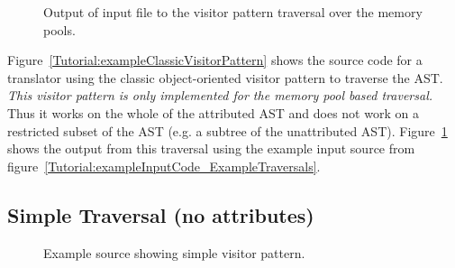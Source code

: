 \begin{figure}[!h]
{\indent
{\mySmallFontSize


\begin{latexonly}
   
\end{latexonly}

\begin{htmlonly}
   
\end{htmlonly}

}
}
\caption{Output of input file to the visitor pattern traversal over the memory pools.}
\label{Tutorial:exampleOutput_ClassicVisitorPattern}
\end{figure}

Figure~\ref{Tutorial:exampleClassicVisitorPattern} shows the source code 
for a translator using the classic object-oriented visitor pattern 
to traverse the AST.  {\em This visitor pattern is only implemented
for the memory pool based traversal.}  Thus it works on the whole
of the attributed AST and does not work on a restricted subset of 
the AST (e.g. a subtree of the unattributed AST).
Figure~\ref{Tutorial:exampleOutput_ClassicVisitorPattern} shows the 
output from this traversal using the example input source from 
figure~\ref{Tutorial:exampleInputCode_ExampleTraversals}.



\subsection{Simple Traversal (no attributes)}
\label{ASTSimpleProcessing_traversal}

\begin{figure}[!h]
{\indent
{\mySmallFontSize

\begin{latexonly}
   
\end{latexonly}

\begin{htmlonly}
   
\end{htmlonly}

}
}
\caption{Example source showing simple visitor pattern.}
\label{Tutorial:exampleVisitorTraversal}
\end{figure}



